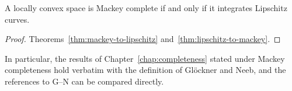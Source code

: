 \begin{corollary}
  \label{cor:mackey-iff}
  \leanok
  A locally convex space is Mackey complete if and only if it integrates Lipschitz curves.
\end{corollary}

\begin{proof}
  \leanok
  Theorems~\ref{thm:mackey-to-lipschitz} and~\ref{thm:lipschitz-to-mackey}.
\end{proof}

In particular, the results of Chapter~\ref{chap:completeness} stated under Mackey completeness
hold verbatim with the definition of Glöckner and Neeb, and the references to G--N can be
compared directly.
